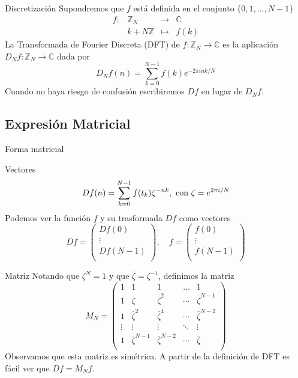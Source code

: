 \documentclass[11pt,compress]{beamer}
\newcommand\C{\mathbb{C}}
\newcommand\Z{\mathbb{Z}}
\begin{document}
\begin{frame}
\begin{block}{Discretización}
Supondremos que $f$ está definida en el conjunto $\{ 0,1,\dots ,N-1 \}$
\[
    \begin{array}{rccl}
        f : & \Z _N & \longrightarrow & \C \\
        & k+N\Z & \longmapsto & f(k)
    \end{array}
\]
La Transformada de Fourier Discreta (DFT) de $f : \Z _N \to \C $ es la aplicación $D_N f : \Z_N \to \C$ dada por
    \[
        D_N f(n) = \sum_{k=0}^{N-1}f(k)e^{-2\pi ink/N}
    \]
Cuando no haya riesgo de confusión escribiremos $D f$ en lugar de $D_N f$.
\end{block}
\end{frame}
\subsection{Expresión Matricial}
\begin{frame}{Forma matricial}
\begin{block}{Vectores}
\[
Df(n)=\sum_{k=0}^{N-1}f(t_k) \zeta^{-nk}, \hbox{ con }  \zeta=e^{2\pi i/N}
\]
Podemos ver la función $f$ y su trasformada $Df$ como vectores
\[
Df=\begin{pmatrix}
Df(0)\\ \vdots \\Df(N-1)\\
\end{pmatrix}
, \quad
f=\begin{pmatrix}
f(0)\\ \vdots \\f(N-1)\\
\end{pmatrix}
\]
\end{block}
\end{frame}

\begin{frame}
\begin{block}{Matriz}
Notando que $\zeta^N = 1$ y que $\overline{\zeta} = \zeta ^{-1}$, definimos la matriz
\[
M_{N}=\begin{pmatrix}
1&1&1&\dots&1 \\
1&\overline{ \zeta}&\overline{ \zeta}^{2}&\cdots&\overline{ \zeta}^{N-1}\\
1&\overline{ \zeta}^{2}&\overline{ \zeta}^{4}&\cdots&\overline{ \zeta}^{N-2}\\
\vdots&\vdots&\vdots&\ddots&\vdots\\
1&\overline{ \zeta}^{N-1}&\overline{ \zeta}^{N-2}&\cdots&\overline{ \zeta}\\
\end{pmatrix}
\]
Observamos que esta matriz es simétrica.
A partir de la definición de DFT es fácil ver que $Df = M_Nf$.
\end{block}
\end{frame}
\end{document}
